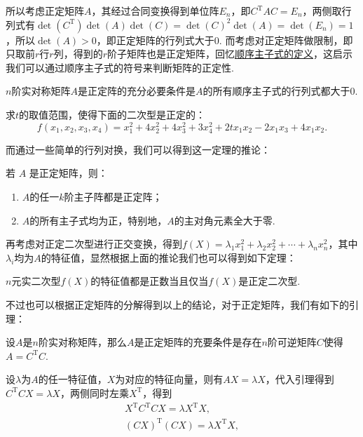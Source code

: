 所以考虑正定矩阵$A$，其经过合同变换得到单位阵$E_n$，即$C^\mathrm{T}AC = E_n$，两侧取行列式有$\det(C^\mathrm{T})\det(A)\det(C)=\det(C)^2\det(A)=\det(E_n)=1$，所以$\det(A)>0$，即正定矩阵的行列式大于$0$. 而考虑对正定矩阵做限制，即只取前$r$行$r$列，得到的$r$阶子矩阵也是正定矩阵，回忆\hyperref[def:子式、主子式、顺序主子式]{顺序主子式的定义}，这启示我们可以通过顺序主子式的符号来判断矩阵的正定性.

\begin{theorem}{}{}
    $n$阶实对称矩阵$A$是正定阵的充分必要条件是$A$的所有顺序主子式的行列式都大于$0$.
\end{theorem}

\begin{example}{}{}
    求$t$的取值范围，使得下面的二次型是正定的：
    \[f(x_1,x_2,x_3,x_4) = x_1^2+4x_2^2+4x_3^2+3x_4^2+2tx_1x_2-2x_1x_3+4x_1x_2.\]
\end{example}

而通过一些简单的行列对换，我们可以得到这一定理的推论：
\begin{corollary}{}{}
    若 $A$ 是正定矩阵，则：
    \begin{enumerate}
        \item $A$的任一$k$阶主子阵都是正定阵；
        \item $A$的所有主子式均为正，特别地，$A$的主对角元素全大于零.
    \end{enumerate}
\end{corollary}

再考虑对正定二次型进行正交变换，得到$f(X) = \lambda_1 x_1^2 + \lambda_2 x_2^2 + \cdots + \lambda_n x_n^2$，其中$\lambda_i$均为$A$的特征值，显然根据上面的推论我们也可以得到如下定理：

\begin{theorem}{}{}
    $n$元实二次型$f(X)$的特征值都是正数当且仅当$f(X)$是正定二次型.
\end{theorem}

不过也可以根据正定矩阵的分解得到以上的结论，对于正定矩阵，我们有如下的引理：

\begin{lemma}{}{}
    设$A$是$n$阶实对称矩阵，那么$A$是正定矩阵的充要条件是存在$n$阶可逆矩阵$C$使得$A=C^\mathrm{T}C$.
\end{lemma}

设$\lambda$为$A$的任一特征值，$X$为对应的特征向量，则有$AX = \lambda X$，代入引理得到$C^\mathrm{T}CX = \lambda X$，两侧同时左乘$X^\mathrm{T}$，得到
\begin{gather*}
    X^\mathrm{T}C^\mathrm{T}CX = \lambda X^\mathrm{T}X, \\
    (CX)^\mathrm{T}(CX) = \lambda X^\mathrm{T}X,
\end{gather*}

